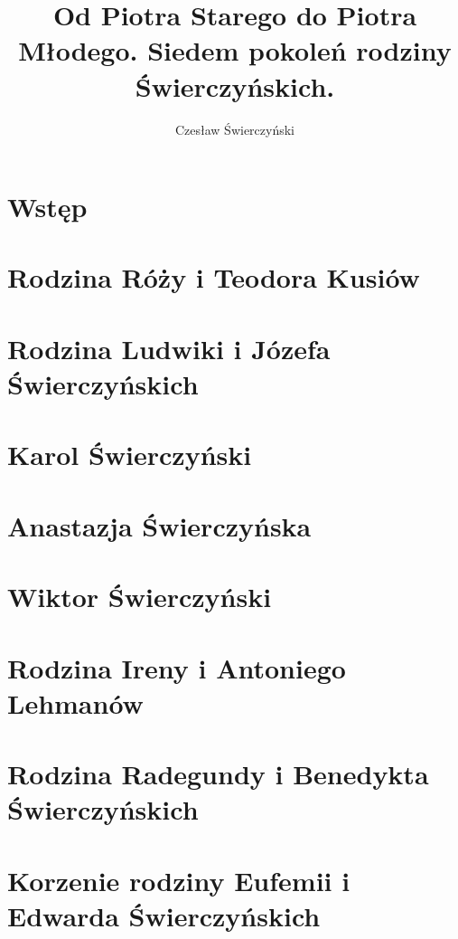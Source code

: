 \documentclass[12pt,a4paper,twoside]{extreport}
\title {Od Piotra Starego do Piotra Młodego. 
\newline
Siedem pokoleń rodziny Świerczyńskich.}
\author {Czesław Świerczyński}
\date {}
\begin{document}


\onehalfspacing 

\chapter{Wstęp}
\label{chap:wstep}


\chapter{Rodzina Róży i Teodora Kusiów}
\label{chap:kusiowie}


\chapter{Rodzina Ludwiki i Józefa Świerczyńskich}
\label{chap:ludwika_jozef_swierczynscy}


\chapter{Karol Świerczyński}
\label{chap:karol_swierczynski}


\chapter{Anastazja Świerczyńska}
\label{chap:anastazja_swierczynska}


\chapter{Wiktor Świerczyński}
\label{chap:wiktor_swierczynski}


\chapter{Rodzina Ireny i Antoniego Lehmanów}
\label{chap:irena_antoni_lehman}


\chapter{Rodzina Radegundy i Benedykta Świerczyńskich}
\label{chap:radegunda_benedykt_swierczynscy}


\chapter{Korzenie rodziny Eufemii i Edwarda Świerczyńskich}
\label{chap:historia_swierczynskich}






\tableofcontents
\listoffigures
\end{document}
